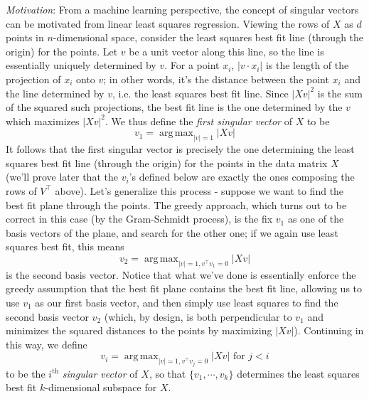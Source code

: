 \documentclass{article}
\DeclareMathOperator*{\argmax}{arg\,max}
\begin{document}
\newline \newline
\textit{Motivation}: From a machine learning perspective, the concept of singular vectors can be motivated from linear least squares regression. Viewing the rows of $ X $ as $ d $ points in $ n $-dimensional space, consider the least squares best fit line (through the origin) for the points. Let $ v $ be a unit vector along this line, so the line is essentially uniquely determined by $ v $. For a point $ x_i $, $ | v \cdot x_i | $ is the length of the projection of $ x_i $ onto $ v $; in other words, it's the distance between the point $ x_i $ and the line determined by $ v $, i.e. the least squares best fit line. Since $ | X v |^2 $ is the sum of the squared such projections, the best fit line is the one determined by the $ v $ which maximizes $ | X v |^2 $. We thus define the \textit{first singular vector} of $ X $ to be
$$ v_1 = \argmax_{| v | = 1} | X v | $$
It follows that the first singular vector is precisely the one determining the least squares best fit line (through the origin) for the points in the data matrix $ X $ (we'll prove later that the $ v_i $'s defined below are exactly the ones composing the rows of $ V^\intercal $ above). Let's generalize this process - suppose we  want to find the best fit plane through the points. The greedy approach, which turns out to be correct in this case (by the Gram-Schmidt process), is the fix $ v_1 $ as one of the basis vectors of the plane, and search for the other one; if we again use least squares best fit, this means
$$ v_2 = \argmax_{| v | = 1, v^\intercal v_1 = 0} | X v | $$
is the second basis vector. Notice that what we've done is essentially enforce the greedy assumption that the best fit plane contains the best fit line, allowing us to use $ v_1 $ as our first basis vector, and then simply use least squares to find the second basis vector $ v_2 $ (which, by design, is both perpendicular to $ v_1 $ and minimizes the squared distances to the points by maximizing $ | X v | $). Continuing in this way, we define
$$ v_i = \argmax_{| v | = 1, v^\intercal v_j = 0} | X v | \text{ for } j < i $$
to be the $ i^{\text{th}} $ \textit{singular vector} of $ X $, so that $ \{ v_1, \cdots, v_k \} $ determines the least squares best fit $ k $-dimensional subspace for $ X $.
\newline \newline
\end{document}
